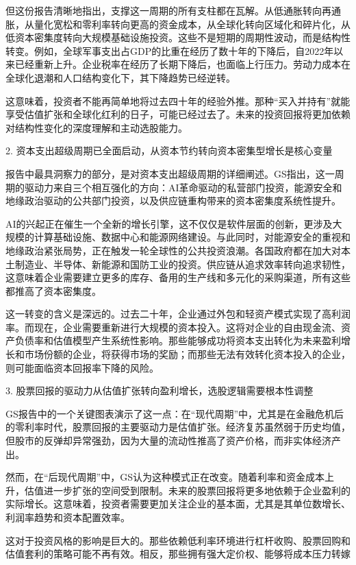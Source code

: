 \documentclass[11pt]{ctexart}
\begin{document}
但这份报告清晰地指出，支撑这一周期的所有支柱都在瓦解。从低通胀转向再通胀，从量化宽松和零利率转向更高的资金成本，从全球化转向区域化和碎片化，从低资本密集度转向大规模基础设施投资。这些不是短期的周期性波动，而是结构性转变。例如，全球军事支出占GDP的比重在经历了数十年的下降后，自2022年以来已经重新上升。企业税率在经历了长期下降后，也面临上行压力。劳动力成本在全球化退潮和人口结构变化下，其下降趋势已经逆转。

这意味着，投资者不能再简单地将过去四十年的经验外推。那种“买入并持有”就能享受估值扩张和全球化红利的日子，可能已经过去了。未来的投资回报将更加依赖对结构性变化的深度理解和主动选股能力。

2. 资本支出超级周期已全面启动，从资本节约转向资本密集型增长是核心变量

报告中最具洞察力的部分，是对资本支出超级周期的详细阐述。GS指出，这一周期的驱动力来自三个相互强化的方向：AI革命驱动的私营部门投资，能源安全和地缘政治驱动的公共部门投资，以及供应链重构带来的资本密集度系统性提升。

AI的兴起正在催生一个全新的增长引擎，这不仅仅是软件层面的创新，更涉及大规模的计算基础设施、数据中心和能源网络建设。与此同时，对能源安全的重视和地缘政治紧张局势，正在触发一轮全球性的公共投资浪潮。各国政府都在加大对本土制造业、半导体、新能源和国防工业的投资。供应链从追求效率转向追求韧性，这意味着企业需要建立更多的库存、备用的生产线和多元化的采购渠道，所有这些都推高了资本密集度。

这一转变的含义是深远的。过去二十年，企业通过外包和轻资产模式实现了高利润率。而现在，企业需要重新进行大规模的资本投入。这将对企业的自由现金流、资产负债率和估值模型产生系统性影响。那些能够成功将资本支出转化为未来盈利增长和市场份额的企业，将获得市场的奖励；而那些无法有效转化资本投入的企业，则可能面临资本回报率下降的风险。

3. 股票回报的驱动力从估值扩张转向盈利增长，选股逻辑需要根本性调整

GS报告中的一个关键图表演示了这一点：在“现代周期”中，尤其是在金融危机后的零利率时代，股票回报的主要驱动力是估值扩张。经济复苏虽然弱于历史均值，但股市的反弹却异常强劲，因为大量的流动性推高了资产价格，而非实体经济产出。

然而，在“后现代周期”中，GS认为这种模式正在改变。随着利率和资金成本上升，估值进一步扩张的空间受到限制。未来的股票回报将更多地依赖于企业盈利的实际增长。这意味着，投资者需要更加关注企业的基本面，尤其是其单位数增长、利润率趋势和资本配置效率。

这对于投资风格的影响是巨大的。那些依赖低利率环境进行杠杆收购、股票回购和估值套利的策略可能不再有效。相反，那些拥有强大定价权、能够将成本压力转嫁
\end{document}
